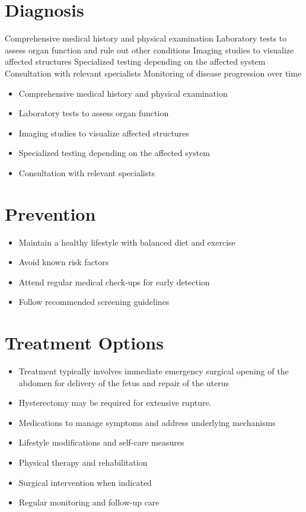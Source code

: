 \section{Diagnosis}
Comprehensive medical history and physical examination Laboratory tests to assess organ function and rule out other conditions Imaging studies to visualize affected structures Specialized testing depending on the affected system Consultation with relevant specialists Monitoring of disease progression over time

\begin{itemize}[noitemsep]
  \item Comprehensive medical history and physical examination
  \item Laboratory tests to assess organ function
  \item Imaging studies to visualize affected structures
  \item Specialized testing depending on the affected system
  \item Consultation with relevant specialists
\end{itemize}
\section{Prevention}
\begin{itemize}[noitemsep]
  \item Maintain a healthy lifestyle with balanced diet and exercise
  \item Avoid known risk factors
  \item Attend regular medical check-ups for early detection
  \item Follow recommended screening guidelines
\end{itemize}
\section{Treatment Options}
\begin{itemize}[noitemsep]
  \item Treatment typically involves immediate emergency surgical opening of the abdomen for delivery of the fetus and repair of the uterus
  \item Hysterectomy may be required for extensive rupture.
  \item Medications to manage symptoms and address underlying mechanisms
  \item Lifestyle modifications and self-care measures
  \item Physical therapy and rehabilitation
  \item Surgical intervention when indicated
  \item Regular monitoring and follow-up care
\end{itemize}
